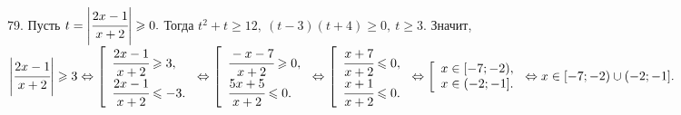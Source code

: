 79. Пусть $t=\left|\cfrac{2x-1}{x+2}\right|\geqslant0.$ Тогда $t^2+t\geqslant12,\ (t-3)(t+4)\geqslant0,\ t\geqslant3.$ Значит, $\left|\cfrac{2x-1}{x+2}\right|\geqslant3\Leftrightarrow\left[\begin{array}{l}\cfrac{2x-1}{x+2}\geqslant3,\\ \cfrac{2x-1}{x+2}\leqslant-3.\end{array}\right.
\Leftrightarrow\left[\begin{array}{l}\cfrac{-x-7}{x+2}\geqslant0,\\ \cfrac{5x+5}{x+2}\leqslant0.\end{array}\right.
\Leftrightarrow\left[\begin{array}{l}\cfrac{x+7}{x+2}\leqslant0,\\ \cfrac{x+1}{x+2}\leqslant0.\end{array}\right.
\Leftrightarrow\left[\begin{array}{l}x\in[-7;-2),\\ x\in(-2;-1].\end{array}\right.\Leftrightarrow
x\in[-7;-2)\cup(-2;-1].$\\
